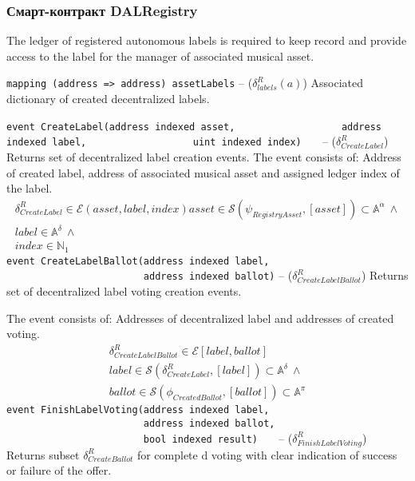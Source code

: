 \documentclass[12pt]{report}
\def\code#1{\colorbox{light-gray}{\texttt{#1}}}
\begin{document}
\subsubsection{Смарт-контракт DALRegistry}
\label{tech-apps-dal-registry}
The ledger of registered autonomous labels is required to keep record and provide access to the label for the manager of associated musical asset.

\code{mapping (address => address) assetLabels} – ($\delta^R_{labels}(a)$)\hfill\null\linebreak
Associated dictionary of created decentralized labels.

\code{event CreateLabel(address indexed asset,}\hfill\null\linebreak
\code{~~~~~~~~~~~~~~~~~~address indexed label,}\hfill\null\linebreak
\code{~~~~~~~~~~~~~~~~~~uint indexed index)~~~} – ($\delta^R_{CreateLabel}$)\hfill\null\linebreak
Returns set of decentralized label creation events. The event consists of: Address of created label, address of associated musical asset and assigned ledger index of the label.
\begin{equation}
\begin{aligned}
\delta^R_{CreateLabel} \in \mathcal{E}(asset, label, index)
asset \in \mathcal{S}(\psi_{RegistryAsset}, [asset]) \subset \mathbb{A}^\alpha \ \wedge \\
label \in \mathbb{A}^\delta \ \wedge \\
index \in \mathbb{N}_1
\end{aligned}
\end{equation}
\code{event CreateLabelBallot(address indexed label,~} \hfill\null\linebreak
\code{~~~~~~~~~~~~~~~~~~~~~~~~address indexed ballot)} – ($\delta^R_{CreateLabelBallot}$)\hfill\null\linebreak
Returns set of decentralized label voting creation events.

The event consists of: Addresses of decentralized label and addresses of created voting.
\begin{equation}
\begin{aligned}
\delta^R_{CreateLabelBallot} \in \mathcal{E}[label, ballot] \\
label \in \mathcal{S}(\delta^R_{CreateLabel}, [label]) \subset \mathbb{A}^\delta \ \wedge \\
ballot \in \mathcal{S}(\phi_{CreatedBallot}, [ballot]) \subset \mathbb{A}^\pi
\end{aligned}
\end{equation}
\code{event FinishLabelVoting(address indexed label,~}\hfill\null\linebreak
\code{~~~~~~~~~~~~~~~~~~~~~~~~address indexed ballot,}\hfill\null\linebreak
\code{~~~~~~~~~~~~~~~~~~~~~~~~bool indexed result)~~~} – ($\delta^R_{FinishLabelVoting}$)\hfill\null\linebreak
Returns subset  $\delta^R_{CreateBallot}$ for complete	d voting with clear indication of success or failure of the offer.
\end{document}
